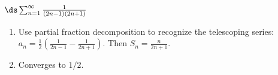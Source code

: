 {$\ds \sum_{n=1}^\infty \frac{1}{(2n-1)(2n+1)}$
}
{\begin{enumerate}
\item	Use partial fraction decomposition to recognize the telescoping series: $a_n = \frac12\left(\frac{1}{2n-1}-\frac{1}{2n+1}\right)$. Then $S_n = \frac{n}{2n+1}$.
\item	Converges to $1/2$.
\end{enumerate}
}
